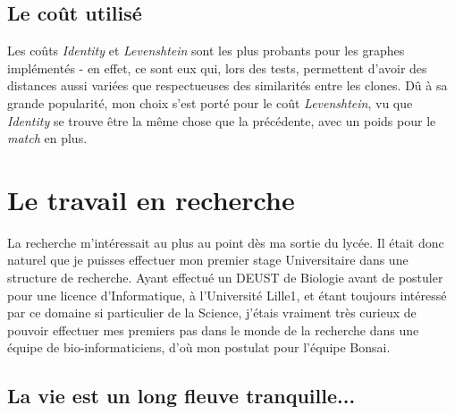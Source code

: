 \documentclass[12pt]{report}
\begin{document}
\begin{spacing}{1.2}
\section{Le coût utilisé}

Les coûts \textit{Identity} et \textit{Levenshtein} sont les plus probants pour les graphes implémentés - en effet, ce sont eux qui, lors des tests, permettent d'avoir des distances aussi variées que respectueuses des similarités entre les clones.
\newline
Dû à sa grande popularité, mon choix s'est porté pour le coût \textit{Levenshtein}, vu que \textit{Identity} se trouve être la même chose que la précédente, avec un poids pour le \textit{match} en plus.

\chapter{Le travail en recherche}

La recherche m'intéressait au plus au point dès ma sortie du lycée.
\newline
Il était donc naturel que je puisses effectuer mon premier stage Universitaire dans une structure de recherche. Ayant effectué un DEUST de Biologie avant de postuler pour une licence d'Informatique, à l'Université Lille1, et étant toujours intéressé par ce domaine si particulier de la Science, j'étais vraiment très curieux de pouvoir effectuer mes premiers pas dans le monde de la recherche dans une équipe de bio-informaticiens, d'où mon postulat pour l'équipe Bonsai.

\section{La vie est un long fleuve tranquille...}


\end{spacing}
\end{document}

